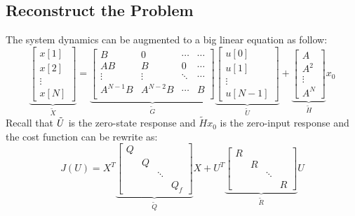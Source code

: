 \documentclass[10pt,a4paper,oneside]{article}
\begin{document}
\subsection{Reconstruct the Problem}
The system dynamics  can be augmented to a big linear equation as follow:
$$
\underbrace{\left[\begin{array}{c}{x[1]} \\ {x[2]} \\ {\vdots} \\{x[N]}\end{array}\right]}_{\tilde{X}}
=
\underbrace{\left[\begin{array}{cccc}
	{B} & {0} & {\cdots} & {\cdots} \\ 
	{A B} & {B} & {0} & {\cdots}  \\ 
	{\vdots} & {\vdots} & {\ddots} & {\cdots} \\ 
	{A^{N-1} B} & {A^{N-2} B} & {\cdots} & {B}\\
	\end{array}\right]}_{\tilde{G}}
\underbrace{\left[\begin{array}{c}{u[0]} \\ {u[1]} \\ {\vdots} \\ {u[N-1]}\end{array}\right]}_{\tilde{U}}+
\underbrace{\left[\begin{array}{c}{A} \\ {A^{2}} \\ {\vdots} \\ {A^{N}}\end{array}\right]}_{\tilde{H}} x_{0}
$$
Recall that $\title{G}\tilde{U}$ is the zero-state response and $\tilde{H}x_0$ is the zero-input response and the cost function can be rewrite as:
\[
J(U) = 
X^T\underbrace{\left[\begin{array}{cccc}
	{Q} & {} & {} & {} \\ 
	{} & {Q} & {} & {} \\ 
	{} & {} & {\ddots} & {} \\ 
	{} & {} & {} & {Q_f}\end{array}\right]}_{\tilde{Q}}X+
U^T\underbrace{\left[\begin{array}{cccc}
	{R} & {} & {} & {} \\ 
	{} & {R} & {} & {} \\ 
	{} & {} & {\ddots} & {} \\
	 {} & {} & {} & {R}\end{array}\right]}_{\tilde{R}}U
\]
\end{document}
